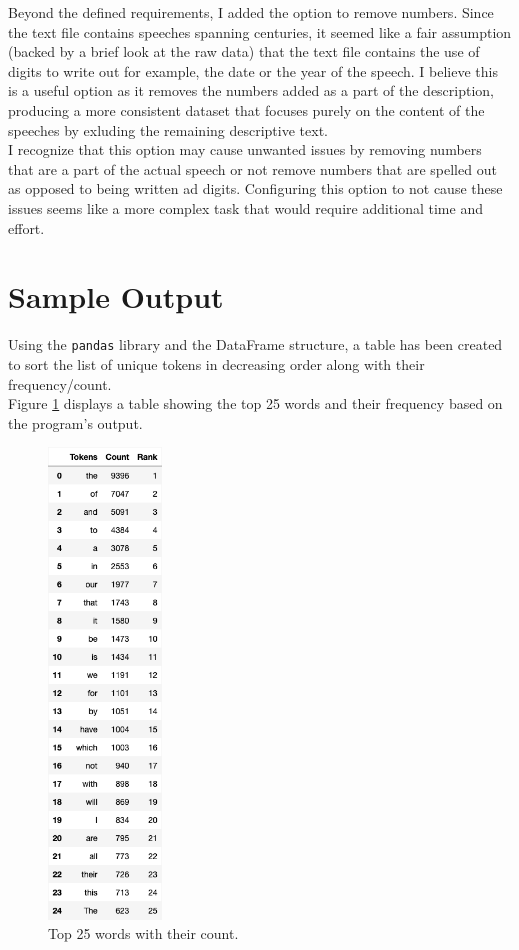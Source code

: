 \documentclass[titlepage]{article}
\begin{document}
Beyond the defined requirements, I added the option to remove numbers. Since the text file
contains speeches spanning centuries, it seemed like a fair assumption (backed by a brief look
at the raw data) that the text file contains the use of digits to write out for example, the date
or the year of the speech. I believe this is a useful option as it removes the numbers added as a 
part of the description, producing a more consistent dataset that focuses purely on the content of 
the speeches by exluding the remaining descriptive text.\\

I recognize that this option may cause unwanted issues by removing numbers that are a part of the 
actual speech or not remove numbers that are spelled out as opposed to being written ad digits.
Configuring this option to not cause these issues seems like a more complex task that would require
additional time and effort.

\section{Sample Output}
Using the \texttt{pandas} library and the DataFrame structure, a table has been created to sort 
the list of unique tokens in decreasing order along with their frequency/count.\\

Figure \ref{fig:FigTop25} displays a table showing the top 25 words and their frequency based on 
the program's output.

\begin{figure}[H]
    \centering
    \includegraphics[width=0.27\textwidth]{figures/df_top25.png}
    \caption{Top 25 words with their count.}
    \label{fig:FigTop25}
\end{figure}
\end{document}
